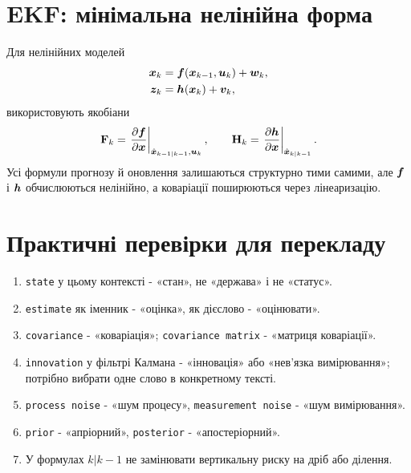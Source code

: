\section{EKF: мінімальна нелінійна форма}

Для нелінійних моделей
\begin{align}
    \bm{x}_k &= \bm{f}(\bm{x}_{k-1},\bm{u}_k)+\bm{w}_k,\\
    \bm{z}_k &= \bm{h}(\bm{x}_k)+\bm{v}_k,
\end{align}
використовують якобіани
\begin{equation}
    \mathbf{F}_k = \left.\frac{\partial \bm{f}}{\partial \bm{x}}\right|_{\hat{\bm{x}}_{k-1|k-1},\bm{u}_k},
    \qquad
    \mathbf{H}_k = \left.\frac{\partial \bm{h}}{\partial \bm{x}}\right|_{\hat{\bm{x}}_{k|k-1}}.
\end{equation}
Усі формули прогнозу й оновлення залишаються структурно тими самими, але $\bm{f}$ і $\bm{h}$ обчислюються нелінійно, а коваріації поширюються через лінеаризацію.

\section{Практичні перевірки для перекладу}

\begin{enumerate}[label=\arabic*.]
  \item \texttt{state} у цьому контексті - «стан», не «держава» і не «статус».
  \item \texttt{estimate} як іменник - «оцінка», як дієслово - «оцінювати».
  \item \texttt{covariance} - «коваріація»; \texttt{covariance matrix} - «матриця коваріації».
  \item \texttt{innovation} у фільтрі Калмана - «інновація» або «нев'язка вимірювання»; потрібно вибрати одне слово в конкретному тексті.
  \item \texttt{process noise} - «шум процесу», \texttt{measurement noise} - «шум вимірювання».
  \item \texttt{prior} - «апріорний», \texttt{posterior} - «апостеріорний».
  \item У формулах $k|k-1$ не замінювати вертикальну риску на дріб або ділення.
\end{enumerate}

